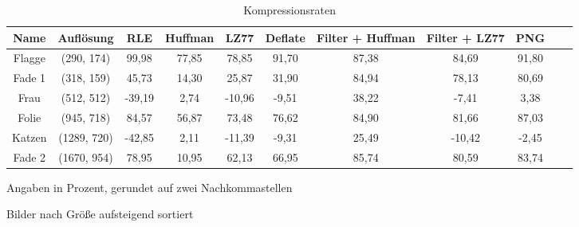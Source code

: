 \documentclass[conference]{IEEEtran}
\begin{document}
\begin{table}
  \renewcommand*{\arraystretch}{1.1}
  \centering
  \begin{threeparttable}
    \caption{Kompressionsraten}
    \label{tab:komprate}
      \begin{tabular}{c *9{c} S[table-format=5.9]}

      \toprule
      Name    &  Auflösung  & RLE   & Huffman   & LZ77  & Deflate   & Filter + Huffman  & Filter + LZ77     & PNG   \\
      \midrule
      Flagge  & (290, 174)  & 99,98  & 77,85     & 78,85  & 91,70     & 87,38             & 84,69             & 91,80  \\
      Fade 1  & (318, 159)  & 45,73  & 14,30     & 25,87  & 31,90     & 84,94             & 78,13             & 80,69  \\
      Frau    & (512, 512)  & -39,19 & 2,74      & -10,96 & -9,51     & 38,22             & -7,41             & 3,38   \\
      Folie   & (945, 718)  & 84,57  & 56,87     & 73,48  & 76,62     & 84,90             & 81,66             & 87,03  \\
      Katzen  & (1289, 720) & -42,85 & 2,11      & -11,39 & -9,31     & 25,49             & -10,42            & -2,45  \\ 
      Fade 2  & (1670, 954) & 78,95  & 10,95     & 62,13  & 66,95     & 85,74             & 80,59             & 83,74          
    \end{tabular}
    \par{} Angaben in Prozent, gerundet auf zwei Nachkommastellen
    \par{} Bilder nach Größe aufsteigend sortiert
  \end{threeparttable}
\end{table}
\end{document}
